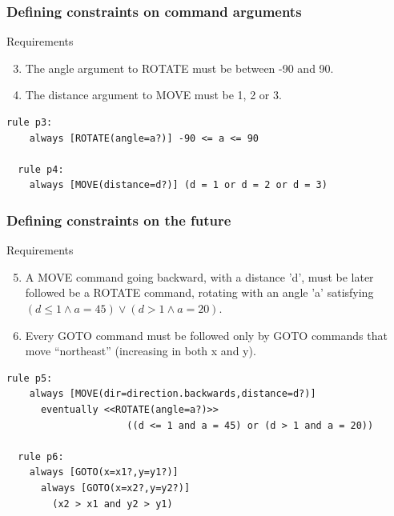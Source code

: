 \begin{frame}[fragile]
  \frametitle{Defining constraints on command arguments} \small

\begin{block}{Requirements}
\begin{enumerate}
    \setcounter{enumi}{2}
    \item The angle argument to ROTATE must be between -90 and 90.
    \item The distance argument to MOVE must be 1, 2 or 3.
\end{enumerate}
\end{block}

\begin{lstlisting}[language=fuzzdsl,frame=single]
  rule p3:   
    always [ROTATE(angle=a?)] -90 <= a <= 90
    
  rule p4: 
    always [MOVE(distance=d?)] (d = 1 or d = 2 or d = 3)   
\end{lstlisting}

\end{frame}


\begin{frame}[fragile]
  \frametitle{Defining constraints on the future} \small

\begin{block}{Requirements}
\begin{enumerate}
\setcounter{enumi}{4}
\item  A MOVE command going backward, with a distance 'd', must be later followed be a ROTATE command, 
rotating with an angle 'a' satisfying $(d \le 1 \wedge a = 45) \vee (d > 1 \wedge a = 20)$.
\item Every GOTO command must be followed only by GOTO commands that move ``northeast'' (increasing in both x and y).
\end{enumerate}
\end{block}

\begin{lstlisting}[language=fuzzdsl,frame=single]
  rule p5: 
    always [MOVE(dir=direction.backwards,distance=d?)] 
      eventually <<ROTATE(angle=a?)>> 
                     ((d <= 1 and a = 45) or (d > 1 and a = 20))

  rule p6: 
    always [GOTO(x=x1?,y=y1?)] 
      always [GOTO(x=x2?,y=y2?)]  
        (x2 > x1 and y2 > y1)    
\end{lstlisting}

\end{frame}



